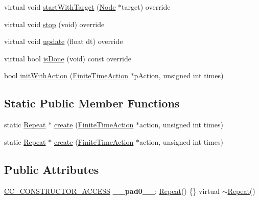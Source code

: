 \begin{DoxyCompactItemize}
\item 
virtual void \hyperlink{classRepeat_a23d4f9f4bd70f5e03cf9662f8c3cd1a2}{start\+With\+Target} (\hyperlink{classNode}{Node} $\ast$target) override
\item 
virtual void \hyperlink{classRepeat_a53b3a08574698685425cd7c55645e57a}{stop} (void) override
\item 
virtual void \hyperlink{classRepeat_a0b3bfedf79ce5588ea7fd5e539285086}{update} (float dt) override
\item 
virtual bool \hyperlink{classRepeat_a2efd4a590fb52dbc862b1e086509b87a}{is\+Done} (void) const override
\item 
bool \hyperlink{classRepeat_a26f37537ecb708cb71f81f681d390965}{init\+With\+Action} (\hyperlink{classFiniteTimeAction}{Finite\+Time\+Action} $\ast$p\+Action, unsigned int times)
\end{DoxyCompactItemize}
\subsection*{Static Public Member Functions}
\begin{DoxyCompactItemize}
\item 
static \hyperlink{classRepeat}{Repeat} $\ast$ \hyperlink{classRepeat_a88174030837b1b6a2bebe265f5da64e9}{create} (\hyperlink{classFiniteTimeAction}{Finite\+Time\+Action} $\ast$action, unsigned int times)
\item 
static \hyperlink{classRepeat}{Repeat} $\ast$ \hyperlink{classRepeat_af428380a0173f262a3d470971c97fce1}{create} (\hyperlink{classFiniteTimeAction}{Finite\+Time\+Action} $\ast$action, unsigned int times)
\end{DoxyCompactItemize}
\subsection*{Public Attributes}
\begin{DoxyCompactItemize}
\item 
\mbox{\label{classRepeat_a5ae89b2e844bb78fe214552980897b47}} 
\hyperlink{_2cocos2d_2cocos_2base_2ccConfig_8h_a25ef1314f97c35a2ed3d029b0ead6da0}{C\+C\+\_\+\+C\+O\+N\+S\+T\+R\+U\+C\+T\+O\+R\+\_\+\+A\+C\+C\+E\+SS} {\bfseries \+\_\+\+\_\+pad0\+\_\+\+\_\+}\+: \hyperlink{classRepeat}{Repeat}() \{\} virtual $\sim$\hyperlink{classRepeat}{Repeat}()
\end{DoxyCompactItemize}
